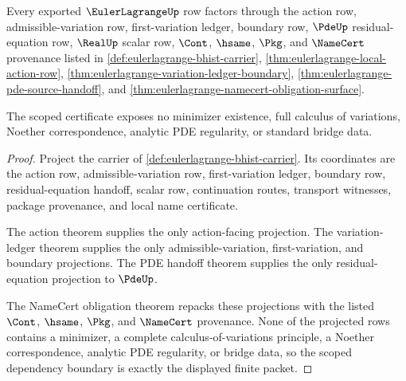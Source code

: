 \begin{theorem}
\label{thm:eulerlagrange-scoped-dependency-certificate}
Every exported $\EulerLagrangeUp$ row factors through the action row,
admissible-variation row, first-variation ledger, boundary row, $\PdeUp$
residual-equation row, $\RealUp$ scalar row, $\Cont$, $\hsame$, $\Pkg$, and
$\NameCert$ provenance listed in \autoref{def:eulerlagrange-bhist-carrier},
\autoref{thm:eulerlagrange-local-action-row},
\autoref{thm:eulerlagrange-variation-ledger-boundary},
\autoref{thm:eulerlagrange-pde-source-handoff}, and
\autoref{thm:eulerlagrange-namecert-obligation-surface}.

The scoped certificate exposes no minimizer existence, full calculus of
variations, Noether correspondence, analytic PDE regularity, or standard bridge
data.
\end{theorem}
\begin{proof}
Project the carrier of \autoref{def:eulerlagrange-bhist-carrier}. Its
coordinates are the action row, admissible-variation row, first-variation
ledger, boundary row, residual-equation handoff, scalar row, continuation
routes, transport witnesses, package provenance, and local name certificate.

The action theorem supplies the only action-facing projection. The
variation-ledger theorem supplies the only admissible-variation,
first-variation, and boundary projections. The PDE handoff theorem supplies the
only residual-equation projection to $\PdeUp$.

The NameCert obligation theorem repacks these projections with the listed
$\Cont$, $\hsame$, $\Pkg$, and $\NameCert$ provenance. None of the projected rows
contains a minimizer, a complete calculus-of-variations principle, a Noether
correspondence, analytic PDE regularity, or bridge data, so the scoped
dependency boundary is exactly the displayed finite packet.
\end{proof}


